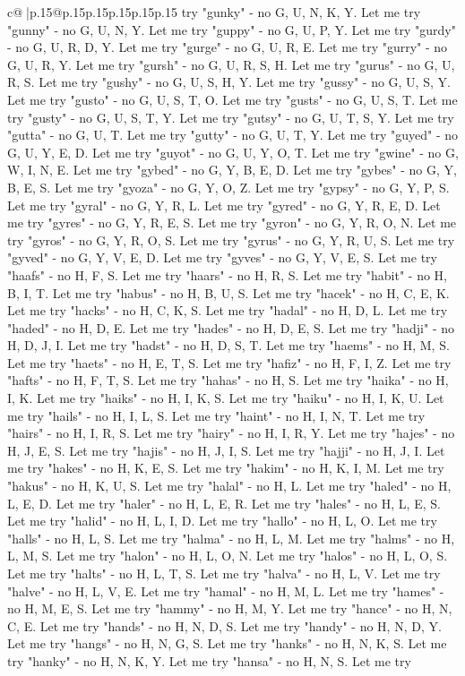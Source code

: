 \documentclass{article}
\begin{document}
{\begin{supertabular}{c@{$\;$}|p{.15\linewidth}@{}p{.15\linewidth}p{.15\linewidth}p{.15\linewidth}p{.15\linewidth}p{.15\linewidth}}
{{{try "gunky" {-} no G, U, N, K, Y. Let me try "gunny" {-} no G, U, N, Y. Let me try "guppy" {-} no G, U, P, Y. Let me try "gurdy" {-} no G, U, R, D, Y. Let me try "gurge" {-} no G, U, R, E. Let me try "gurry" {-} no G, U, R, Y. Let me try "gursh" {-} no G, U, R, S, H. Let me try "gurus" {-} no G, U, R, S. Let me try "gushy" {-} no G, U, S, H, Y. Let me try "gussy" {-} no G, U, S, Y. Let me try "gusto" {-} no G, U, S, T, O. Let me try "gusts" {-} no G, U, S, T. Let me try "gusty" {-} no G, U, S, T, Y. Let me try "gutsy" {-} no G, U, T, S, Y. Let me try "gutta" {-} no G, U, T. Let me try "gutty" {-} no G, U, T, Y. Let me try "guyed" {-} no G, U, Y, E, D. Let me try "guyot" {-} no G, U, Y, O, T. Let me try "gwine" {-} no G, W, I, N, E. Let me try "gybed" {-} no G, Y, B, E, D. Let me try "gybes" {-} no G, Y, B, E, S. Let me try "gyoza" {-} no G, Y, O, Z. Let me try "gypsy" {-} no G, Y, P, S. Let me try "gyral" {-} no G, Y, R, L. Let me try "gyred" {-} no G, Y, R, E, D. Let me try "gyres" {-} no G, Y, R, E, S. Let me try "gyron" {-} no G, Y, R, O, N. Let me try "gyros" {-} no G, Y, R, O, S. Let me try "gyrus" {-} no G, Y, R, U, S. Let me try "gyved" {-} no G, Y, V, E, D. Let me try "gyves" {-} no G, Y, V, E, S. Let me try "haafs" {-} no H, F, S. Let me try "haars" {-} no H, R, S. Let me try "habit" {-} no H, B, I, T. Let me try "habus" {-} no H, B, U, S. Let me try "hacek" {-} no H, C, E, K. Let me try "hacks" {-} no H, C, K, S. Let me try "hadal" {-} no H, D, L. Let me try "haded" {-} no H, D, E. Let me try "hades" {-} no H, D, E, S. Let me try "hadji" {-} no H, D, J, I. Let me try "hadst" {-} no H, D, S, T. Let me try "haems" {-} no H, M, S. Let me try "haets" {-} no H, E, T, S. Let me try "hafiz" {-} no H, F, I, Z. Let me try "hafts" {-} no H, F, T, S. Let me try "hahas" {-} no H, S. Let me try "haika" {-} no H, I, K. Let me try "haiks" {-} no H, I, K, S. Let me try "haiku" {-} no H, I, K, U. Let me try "hails" {-} no H, I, L, S. Let me try "haint" {-} no H, I, N, T. Let me try "hairs" {-} no H, I, R, S. Let me try "hairy" {-} no H, I, R, Y. Let me try "hajes" {-} no H, J, E, S. Let me try "hajis" {-} no H, J, I, S. Let me try "hajji" {-} no H, J, I. Let me try "hakes" {-} no H, K, E, S. Let me try "hakim" {-} no H, K, I, M. Let me try "hakus" {-} no H, K, U, S. Let me try "halal" {-} no H, L. Let me try "haled" {-} no H, L, E, D. Let me try "haler" {-} no H, L, E, R. Let me try "hales" {-} no H, L, E, S. Let me try "halid" {-} no H, L, I, D. Let me try "hallo" {-} no H, L, O. Let me try "halls" {-} no H, L, S. Let me try "halma" {-} no H, L, M. Let me try "halms" {-} no H, L, M, S. Let me try "halon" {-} no H, L, O, N. Let me try "halos" {-} no H, L, O, S. Let me try "halts" {-} no H, L, T, S. Let me try "halva" {-} no H, L, V. Let me try "halve" {-} no H, L, V, E. Let me try "hamal" {-} no H, M, L. Let me try "hames" {-} no H, M, E, S. Let me try "hammy" {-} no H, M, Y. Let me try "hance" {-} no H, N, C, E. Let me try "hands" {-} no H, N, D, S. Let me try "handy" {-} no H, N, D, Y. Let me try "hangs" {-} no H, N, G, S. Let me try "hanks" {-} no H, N, K, S. Let me try "hanky" {-} no H, N, K, Y. Let me try "hansa" {-} no H, N, S. Let me try }}}
\end{supertabular}}
\end{document}

